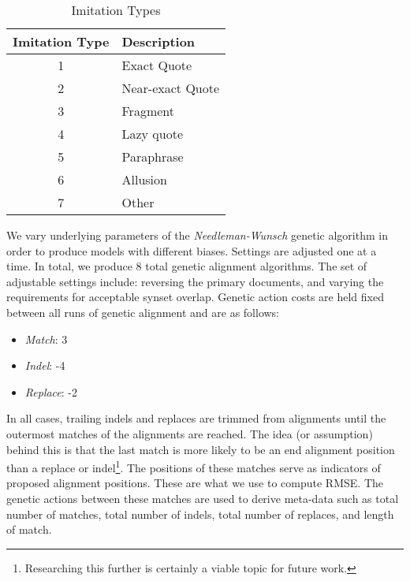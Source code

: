 \begin{table}[center]
	\begin{center}
		\begin{tabular}{|c|l|} \hline
			\textbf{Imitation Type}	& \textbf{Description}		\\ \hline \hline
			1						& Exact Quote				\\ \hline
			2						& Near-exact Quote			\\ \hline
			3						& Fragment					\\ \hline
			4						& Lazy quote				\\ \hline
			5						& Paraphrase				\\ \hline
			6						& Allusion					\\ \hline
			7						& Other						\\ \hline
		\end{tabular}
	\end{center}
	
	\caption{Imitation Types}
	\label{tab:imitation-types}
\end{table}

We vary underlying parameters of the \textit{Needleman-Wunsch} genetic algorithm in order to produce models with different biases. Settings are adjusted one at a time. In total, we produce 8 total genetic alignment algorithms. The set of adjustable settings include: reversing the primary documents, %
and varying the requirements for acceptable synset overlap. Genetic action costs are held fixed between all runs of genetic alignment and are as follows:

	\begin{itemize}
		\item \textit{Match}: 3
		\item \textit{Indel}: -4
		\item \textit{Replace}: -2
	\end{itemize}

In all cases, trailing indels and replaces are trimmed from alignments until the outermost matches of the alignments are reached. %
The idea (or assumption)%
 behind this is that the last match is more likely to be an end alignment position than a replace or indel\footnote{Researching this further is certainly a viable topic for future work.}.
The positions of these matches serve as indicators of proposed alignment positions. These are what we use to compute RMSE. The genetic actions between these matches are used to derive meta-data such as total number of matches, total number of indels, total number of replaces, and length of match.

